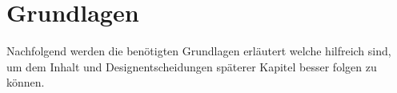 \chapter{Grundlagen}
\begin{Spacing}{\mylinespace}

Nachfolgend werden die benötigten Grundlagen erläutert welche hilfreich sind, um dem
Inhalt und Designentscheidungen späterer Kapitel besser folgen zu können.
\end{Spacing}


%

\clearpage

